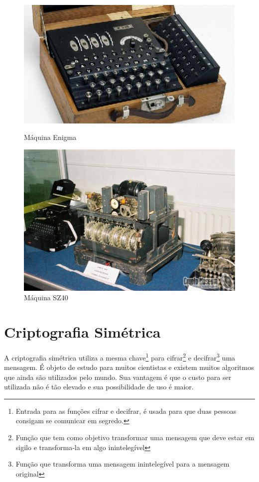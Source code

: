 \begin{figure}[h]
\centering
\begin{minipage}{.5\textwidth}
  \centering
  \includegraphics[keepaspectratio=true,scale=1]
  {figuras/enigma.eps}
  \caption{Máquina Enigma\protect\footnotemark}
  \label{enigma-machine}
\end{minipage}%
\begin{minipage}{.5\textwidth}
  \centering
  \includegraphics[keepaspectratio=true,scale=0.1]
  {figuras/sz40.eps}
  \caption{Máquina SZ40\protect\footnotemark}
    \label{sz40-machine}
\end{minipage}
\end{figure}
%

\section{Criptografia Simétrica}
\label{symmetric-cryptography}

A criptografia simétrica utiliza a mesma chave\footnote{Entrada para as funções cifrar e decifrar, é usada para que duas pessoas consigam se comunicar em segredo.} para cifrar\footnote{Função que tem como objetivo transformar uma mensagem que deve estar em sigilo e transforma-la em algo inintelegível} e decifrar\footnote{Função que transforma uma mensagem inintelegível para a mensagem original} uma mensagem. É objeto de estudo para muitos cientistas e existem muitos algoritmos que ainda são utilizados pelo mundo. Sua vantagem é que o custo para ser utilizada não é tão elevado e sua possibilidade de uso é maior. 

